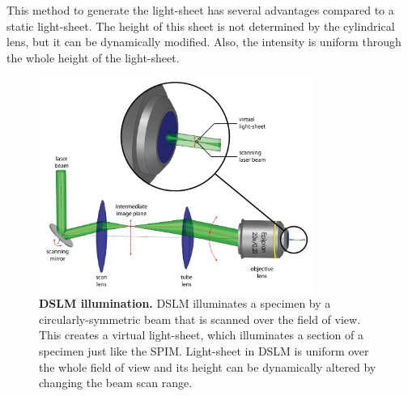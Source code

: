 \documentclass{tdk_style}
\begin{document}
This method to generate the light-sheet has several advantages compared to a static light-sheet. The height of this sheet is not determined by the cylindrical lens, but it can be dynamically modified. Also, the intensity is uniform through the whole height of the light-sheet.


\begin{figure}[hb]
	\centering
	\includegraphics[width=0.8\textwidth]{figures/2_spim/dslm}
	\caption{\textbf{DSLM illumination.} DSLM illuminates a specimen by a circularly-symmetric beam that is scanned over the field of view. This creates a virtual light-sheet, which illuminates a section of a specimen just like the SPIM. Light-sheet in DSLM is uniform over the whole field of view and its height can be dynamically altered by changing the beam scan range.
}
	\label{fig:dslm}
\end{figure}
\end{document}
